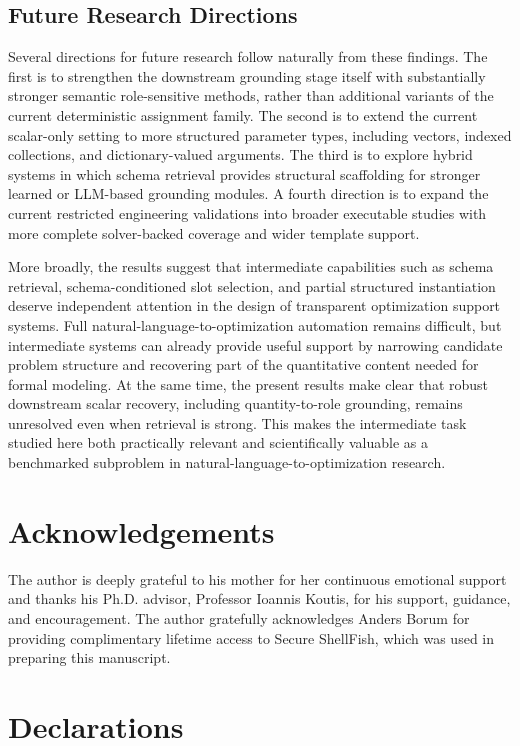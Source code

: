 \documentclass[3p]{elsarticle}
\begin{document}
\subsection{Future Research Directions}
\label{subsec:future_work}

Several directions for future research follow naturally from these findings. The first is to strengthen the downstream grounding stage itself with substantially stronger semantic role-sensitive methods, rather than additional variants of the current deterministic assignment family. The second is to extend the current scalar-only setting to more structured parameter types, including vectors, indexed collections, and dictionary-valued arguments. The third is to explore hybrid systems in which schema retrieval provides structural scaffolding for stronger learned or LLM-based grounding modules. A fourth direction is to expand the current restricted engineering validations into broader executable studies with more complete solver-backed coverage and wider template support.

More broadly, the results suggest that intermediate capabilities such as schema retrieval, schema-conditioned slot selection, and partial structured instantiation deserve independent attention in the design of transparent optimization support systems. Full natural-language-to-optimization automation remains difficult, but intermediate systems can already provide useful support by narrowing candidate problem structure and recovering part of the quantitative content needed for formal modeling. At the same time, the present results make clear that robust downstream scalar recovery, including quantity-to-role grounding, remains unresolved even when retrieval is strong. This makes the intermediate task studied here both practically relevant and scientifically valuable as a benchmarked subproblem in natural-language-to-optimization research.

\section*{Acknowledgements}

The author is deeply grateful to his mother for her continuous emotional support and thanks his Ph.D. advisor, Professor Ioannis Koutis, for his support, guidance, and encouragement. The author gratefully acknowledges Anders Borum for providing complimentary lifetime access to Secure ShellFish, which was used in preparing this manuscript.

\section*{Declarations}
\end{document}
